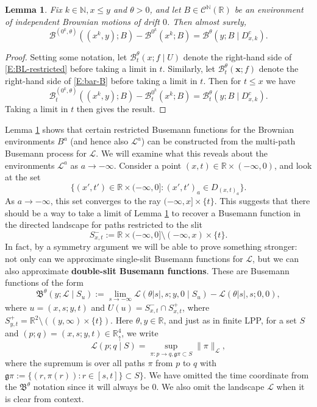 \documentclass[11pt]{article}
\newcommand{\N}{\mathbb{N}}
\newcommand{\R}{\mathbb{R}}
\newcommand{\Rd}{\mathbb{R}^4_\uparrow}
\newcommand{\cB}{\mathcal{B}}
\newcommand{\cC}{\mathcal{C}}
\newcommand{\cL}{\mathcal{L}}
\newcommand{\fB}{\mathfrak{B}}
\newcommand{\X}{\times}
\newcommand{\smin}{\setminus}
\newcommand{\bx}{\mathbf{x}}
\newtheorem{lemma}[theorem]{Lemma}
\theoremstyle{definition} %
\theoremstyle{remark} %
\begin{document}
\begin{lemma}
\label{L:restricted-buse}
Fix $k \in \N, x \le y$ and $\theta > 0$, and let $B \in \cC^\N (\R)$ be an environment of independent Brownian motions of drift $0$. Then almost surely,
$$
\cB^{(0^k, \theta)}((x^k, y) ; B) - \cB^{0^k}(x^k ; B) = \cB^\theta(y ; B \mid D_{x, k}^c).
$$
\end{lemma}

\begin{proof}
Setting some notation, let $\cB_t^\theta(x ; f \mid U)$ denote the right-hand side of \eqref{E:BL-restricted} before taking a limit in $t$. Similarly, let $\cB_t^{\theta}(\bx ; f)$ denote the right-hand side of \eqref{E:bar-B} before taking a limit in $t$. Then for $t \le x$ we have 
$$
\cB^{(0^k, \theta)}_t((x^k, y) ; B) - \cB^{0^k}_t(x^k ; B) = \cB^\theta_t(y ; B \mid D_{x, k}^c).
$$
Taking a limit in $t$ then gives the result.
\end{proof}

Lemma \ref{L:restricted-buse} shows that certain restricted Busemann functions for the Brownian environments $B^{a}$  (and hence also $\cL^a$) can be constructed from the multi-path Busemann process for $\cL$. We will examine what this reveals about the environments $\cL^a$ as $a \to -\infty$. 
Consider a point $(x, t) \in \R \X (-\infty, 0)$, and look at the set 
$$
\{(x', t') \in \R \X (-\infty, 0] : (x', t')_a \in D_{(x, t)_a} \}.
$$
As $a \to -\infty$, this set converges to the ray $(-\infty, x] \X \{t\}$. This suggests that there should be a way to take a limit of Lemma \ref{L:restricted-buse} to recover a Busemann function in the directed landscape for paths restricted to the slit
$$
S_{x, t}^- := \R \X (-\infty, 0] \smin (-\infty, x) \X \{t\}.
$$
In fact, by a symmetry argument we will be able to prove something stronger: not only can we approximate single-slit Busemann functions for $\cL$, but we can also approximate \textbf{double-slit Busemann functions}. These are Busemann functions of the form
$$
\fB^\theta(y ; \cL \mid S_u) := \lim_{s \to -\infty} \cL(\theta|s|, s; y, 0 \mid S_u) -  \cL(\theta|s|, s; 0, 0),
$$	
where $u = (x, s; y, t)$ and $U(u) = S^-_{x, t} \cap S^+_{x, t}$, where $S^+_{y, t} = \R^2 \setminus ((y, \infty) \X \{t\})$. Here $\theta, y \in \R$, and just as in finite LPP, for a set $S$ and $(p; q) = (x, s; y, t) \in \Rd$, we write
$$
\cL(p; q \mid S) = \sup_{\pi:p \to q, \mathfrak g \pi \subset S} \|\pi\|_\cL,
$$
where the supremum is over all paths $\pi$ from $p$ to $q$ with $\mathfrak g \pi := \{(r, \pi(r)) : r \in [s, t]\} \subset S\}.$ We have omitted the time coordinate from the $\fB^\theta$ notation since it will always be $0$. We also omit the landscape $\cL$ when it is clear from context.
\end{document}
